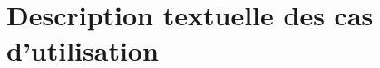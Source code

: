 \documentclass[a4paper,10pt]{article}
\begin{document}
\begin{titlepage}
  
\end{titlepage}
\tableofcontents
\pagebreak



\FloatBarrier
\section{Description textuelle des cas d’utilisation}
  
  
   
   
   

  
\FloatBarrier


\FloatBarrier



\FloatBarrier
%  
\end{document}
